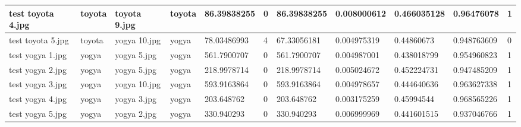 \begin{landscape}
\begin{longtable}{|p{2cm}|p{1.5cm}|p{2cm}|p{1.5cm}|p{2cm}|p{1cm}|p{2cm}|p{2cm}|p{2cm}|p{2cm}|p{1cm}|}
		test toyota 4.jpg    & toyota           & toyota 9.jpg          & toyota                      & 86.39838255           & 0                       & 86.39838255                & 0.008000612           & 0.466035128           & 0.96476078               & 1                \\ \hline
		test toyota 5.jpg    & toyota           & yogya 10.jpg          & yogya                       & 78.03486993           & 4                       & 67.33056181                & 0.004975319           & 0.44860673            & 0.948763609              & 0                \\ \hline
		test yogya 1.jpg     & yogya            & yogya 5.jpg           & yogya                       & 561.7900707           & 0                       & 561.7900707                & 0.004987001           & 0.438018799           & 0.954960823              & 1                \\ \hline
		test yogya 2.jpg     & yogya            & yogya 5.jpg           & yogya                       & 218.9978714           & 0                       & 218.9978714                & 0.005024672           & 0.452224731           & 0.947485209              & 1                \\ \hline
		test yogya 3.jpg     & yogya            & yogya 10.jpg          & yogya                       & 593.9163864           & 0                       & 593.9163864                & 0.004978657           & 0.444640636           & 0.963627338              & 1                \\ \hline
		test yogya 4.jpg     & yogya            & yogya 3.jpg           & yogya                       & 203.648762            & 0                       & 203.648762                 & 0.003175259           & 0.45994544            & 0.968565226              & 1                \\ \hline
		test yogya 5.jpg     & yogya            & yogya 2.jpg           & yogya                       & 330.940293            & 0                       & 330.940293                 & 0.006999969           & 0.441601515           & 0.937046766              & 1                \\ \hline
	\end{longtable}
\end{landscape}

